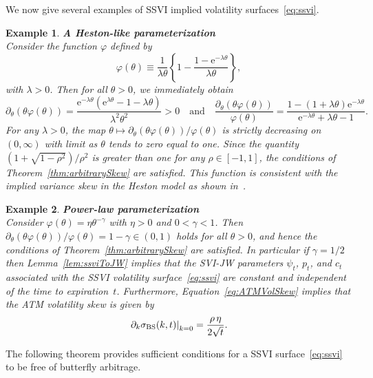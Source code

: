 \documentclass[12pt]{article}
\newtheorem{example}{Example}[section]
\numberwithin{equation}{section}
\newcommand{\Ex}{\mathrm{e}}
\newcommand{\BS}{\rm BS}
\newcommand{\p}{\partial}
\begin{document}
We now give several examples of SSVI implied volatility surfaces~\eqref{eq:ssvi}.
\begin{example}{\bf  A Heston-like parameterization}\label{ex:HestonExample}\\
\noindent Consider the function $\varphi$ defined by
$$
\varphi(\theta)\equiv\frac{1}{\lambda\theta}\left\{1-\frac{1-\Ex^{-\lambda\theta}}{\lambda\theta}\right\},
$$
with $\lambda>0$.
Then for all $\theta>0$, we immediately obtain
$$
\p_\theta\left(\theta\varphi(\theta)\right)
=\frac{\Ex^{-\lambda\theta}\left(\Ex^{ \lambda\theta}-1-\lambda\theta\right)}{\lambda^2\theta^2}>0
\quad\text{and}\quad
\frac{\p_\theta\left(\theta\varphi(\theta)\right)}{\varphi(\theta)}
 = \frac{1-(1+\lambda\theta)\Ex^{-\lambda\theta}}{\Ex^{-\lambda\theta}+\lambda\theta-1}.
$$
For any $\lambda>0$, the map $\theta\mapsto \p_\theta\left(\theta\varphi(\theta)\right) / \varphi(\theta)$
is strictly decreasing on $(0,\infty)$ with limit as $\theta$ tends to zero equal to one.
Since the quantity $(1+\sqrt{1-\rho^2})/\rho^2$ is greater than one for any $\rho\in [-1,1]$, 
the conditions of Theorem~\ref{thm:arbitrarySkew} are satisfied.
This function is consistent with the implied variance skew in the Heston model as shown in~\cite[Equation 3.19]{jimbook}.
\end{example}

\begin{example}{\bf  Power-law parameterization}\label{ex:PowerLaw}\\
\noindent Consider
$\varphi(\theta)=\eta\theta^{-\gamma}$
with $\eta>0$ and $0<\gamma<1$.
Then 
$\p_\theta\left(\theta\varphi(\theta)\right) / \varphi(\theta) = 1-\gamma \in(0,1)$
holds for all $\theta>0$, and hence the conditions of Theorem~\ref{thm:arbitrarySkew} are satisfied.
In particular if $\gamma=1/2$ then Lemma~\ref{lem:ssviToJW} implies that the SVI-JW parameters $\psi_t$, $p_t$, and $c_t$ associated with the SSVI volatility surface~\eqref{eq:ssvi} are constant and independent of the time to expiration~$t$.
Furthermore, Equation~\ref{eq:ATMVolSkew} implies that the ATM volatility skew is given by
$$
\left.\p_k \sigma_{\BS}(k,t)\right|_{k=0}=\frac{\rho\,\eta}{2\sqrt{t}}.
$$
\end{example}



The following theorem provides sufficient conditions for a SSVI surface~\eqref{eq:ssvi} to be free of butterfly arbitrage.
\end{document}
